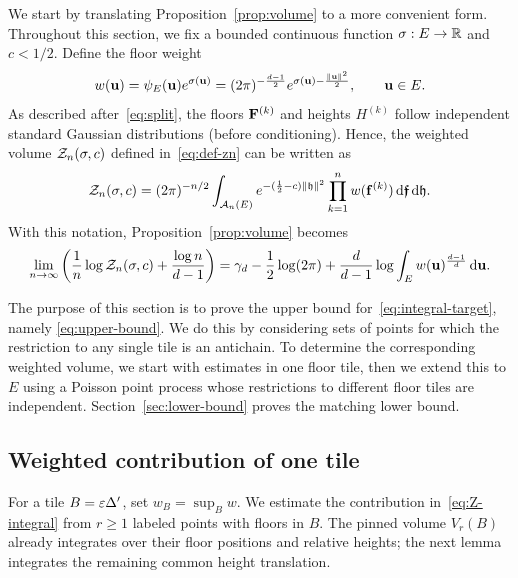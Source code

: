 \documentclass[11pt,letterpaper]{article}
\begin{document}
\label{sec:upper-bound}
We start by translating Proposition~\ref{prop:volume} to a more convenient form. Throughout this section, we fix a bounded continuous function $\sigma:E\to\mathbb R$ and $c<1/2$. Define the floor weight
\begin{equation}\label{eq:floor_weight_def}
      w(\mathbf u)=\psi_E(\mathbf u)e^{\sigma(\mathbf u)}=(2\pi)^{-\frac{d-1}{2}}e^{\sigma(\mathbf u)-\frac{\|\mathbf u\|^2}{2}},\qquad \mathbf u\in E.
\end{equation}
As described after~\eqref{eq:split}, the floors $\mathbf F^{(k)}$ and heights $H^{(k)}$ follow independent standard Gaussian distributions (before conditioning). Hence, the weighted volume $\mathcal Z_n(\sigma,c)$ defined in~\eqref{eq:def-zn} can be written as
\begin{equation}\label{eq:Z-integral}
      \mathcal Z_n(\sigma,c)=(2\pi)^{-n/2}\int_{\mathcal A_n(E)}
      e^{-(\frac12-c)\|\mathfrak h\|^2}\prod_{k=1}^n w(\mathbf f^{(k)})\,\mathrm d\bm{\mathfrak f}\,\mathrm d\mathfrak h.
\end{equation}
With this notation, Proposition~\ref{prop:volume} becomes
\begin{equation}\label{eq:integral-target}
      \lim_{n\to\infty}\left(\frac1n\log\mathcal Z_n(\sigma,c)+\frac{\log n}{d-1}\right)
      =\gamma_d-\frac12\log(2\pi)
      +\frac d{d-1}\log\int_Ew(\mathbf u)^{\frac{d-1}{d}}\,\mathrm d\mathbf u.
\end{equation}

The purpose of this section is to prove the upper bound for~\eqref{eq:integral-target}, namely \eqref{eq:upper-bound}. We do this by considering sets of points for which the restriction to any single tile is an antichain. To determine the corresponding weighted volume, we start with estimates in one floor tile, then we extend this to $E$ using a Poisson point process whose restrictions to different floor tiles are independent. Section~\ref{sec:lower-bound} proves the matching lower bound.

\subsection{Weighted contribution of one tile}
For a tile $B=\varepsilon\Delta'$, set $w_B=\sup_Bw$. We estimate the contribution in~\eqref{eq:Z-integral} from $r\ge1$ labeled points with floors in $B$. The pinned volume $V_r(B)$ already integrates over their floor positions and relative heights; the next lemma integrates the remaining common height translation.
\end{document}
